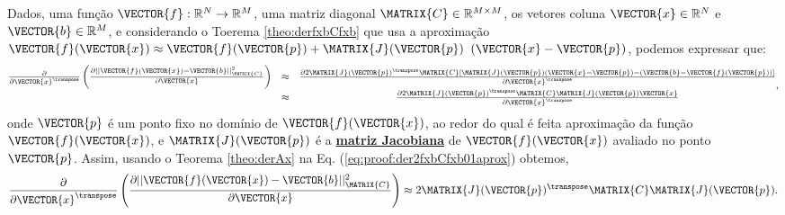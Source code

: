 \begin{myproofT}\label{proof:theo:der2fxbCfxb0aprox}
Dados,
uma função $\VECTOR{f}:\mathbb{R}^{N} \rightarrow \mathbb{R}^{M}$, 
uma matriz diagonal $\MATRIX{C}\in \mathbb{R}^{M\times M}$, 
os vetores coluna $\VECTOR{x}\in \mathbb{R}^{N}$ e 
$\VECTOR{b}\in \mathbb{R}^{M}$, e
considerando o Toerema \ref{theo:derfxbCfxb} que usa a aproximação
$\VECTOR{f}(\VECTOR{x})\approx \VECTOR{f}(\VECTOR{p}) + \MATRIX{J}(\VECTOR{p})$ $\left(\VECTOR{x}-\VECTOR{p}\right)$,
podemos expressar que:
\begin{equation}\label{eq:proof:der2fxbCfxb01aprox}
\begin{matrix}
\frac{\partial }{\partial \VECTOR{x}^{\transpose}}\left( \frac{\partial ||\VECTOR{f}(\VECTOR{x})-\VECTOR{b}||_{\MATRIX{C}}^2}{\partial \VECTOR{x}} \right) & \approx & 
\frac{\partial 2 \MATRIX{J}(\VECTOR{p})^{\transpose}\MATRIX{C}\left[\MATRIX{J}(\VECTOR{p})\left(\VECTOR{x} - \VECTOR{p}\right)-\left(\VECTOR{b}-\VECTOR{f}(\VECTOR{p})\right)\right]}{\partial \VECTOR{x}^{\transpose}} \\
~ & \approx & \frac{\partial 2 \MATRIX{J}(\VECTOR{p})^{\transpose}\MATRIX{C} \MATRIX{J}(\VECTOR{p})\VECTOR{x}  }{\partial \VECTOR{x}^{\transpose}}
\end{matrix},
\end{equation}
onde $\VECTOR{p}$ é um ponto fixo no domínio de $\VECTOR{f}(\VECTOR{x})$,  ao redor do qual é feita  aproximação
da função $\VECTOR{f}(\VECTOR{x})$,
e $\MATRIX{J}(\VECTOR{p})$ é a \hyperref[def:jacobian]{\textbf{matriz Jacobiana}} de $\VECTOR{f}(\VECTOR{x})$ avaliado no ponto $\VECTOR{p}$.
Assim, usando o Teorema \ref{theo:derAx} na Eq. (\ref{eq:proof:der2fxbCfxb01aprox})
obtemos,
\begin{equation}\label{eq:proof:der2fxbCfxb01aprox2}
\frac{\partial }{\partial \VECTOR{x}^{\transpose}}\left( \frac{\partial ||\VECTOR{f}(\VECTOR{x})-\VECTOR{b}||_{\MATRIX{C}}^2}{\partial \VECTOR{x}} \right) \approx 
2 \MATRIX{J}(\VECTOR{p})^{\transpose}\MATRIX{C} \MATRIX{J}(\VECTOR{p}).
\end{equation}
\end{myproofT}

